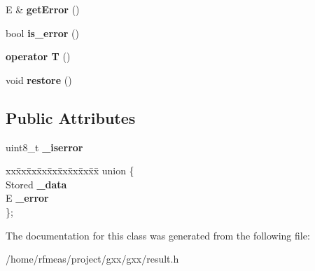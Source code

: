\begin{DoxyCompactItemize}
\item 
E \& {\bfseries get\+Error} ()\hypertarget{classgxx_1_1result__type_1_1result_a7b81fc152030ee3e33250161910d3fbc}{}\label{classgxx_1_1result__type_1_1result_a7b81fc152030ee3e33250161910d3fbc}

\item 
bool {\bfseries is\+\_\+error} ()\hypertarget{classgxx_1_1result__type_1_1result_a764652ed643bfa8da699e507c111bbbe}{}\label{classgxx_1_1result__type_1_1result_a764652ed643bfa8da699e507c111bbbe}

\item 
{\bfseries operator T} ()\hypertarget{classgxx_1_1result__type_1_1result_a6e755f76c0c04513197d0c67a8e9725a}{}\label{classgxx_1_1result__type_1_1result_a6e755f76c0c04513197d0c67a8e9725a}

\item 
void {\bfseries restore} ()\hypertarget{classgxx_1_1result__type_1_1result_a47a7d938b36106f74e06ad366d48d483}{}\label{classgxx_1_1result__type_1_1result_a47a7d938b36106f74e06ad366d48d483}

\end{DoxyCompactItemize}
\subsection*{Public Attributes}
\begin{DoxyCompactItemize}
\item 
uint8\+\_\+t {\bfseries \+\_\+iserror}\hypertarget{classgxx_1_1result__type_1_1result_a356ca461f05c9f57232743a6991605de}{}\label{classgxx_1_1result__type_1_1result_a356ca461f05c9f57232743a6991605de}

\item 
\begin{tabbing}
xx\=xx\=xx\=xx\=xx\=xx\=xx\=xx\=xx\=\kill
union \{\\
\>Stored {\bfseries \_data}\\
\>E {\bfseries \_error}\\
\}; \hypertarget{classgxx_1_1result__type_1_1result_a34057f31e67379703fd4894f1ed3a88c}{}\label{classgxx_1_1result__type_1_1result_a34057f31e67379703fd4894f1ed3a88c}
\\

\end{tabbing}\end{DoxyCompactItemize}


The documentation for this class was generated from the following file\+:\begin{DoxyCompactItemize}
\item 
/home/rfmeas/project/gxx/gxx/result.\+h\end{DoxyCompactItemize}
